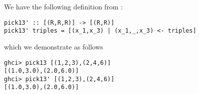 
We have the following definition from :
\begin{verbatim}
pick13' :: [(R,R,R)] -> [(R,R)]
pick13' triples = [(x_1,x_3) | (x_1,_,x_3) <- triples]
\end{verbatim}
which we demonstrate as follows
\begin{verbatim}
ghci> pick13 [(1,2,3),(2,4,6)]
[(1.0,3.0),(2.0,6.0)]
ghci> pick13' [(1,2,3),(2,4,6)]
[(1.0,3.0),(2.0,6.0)]
\end{verbatim}
